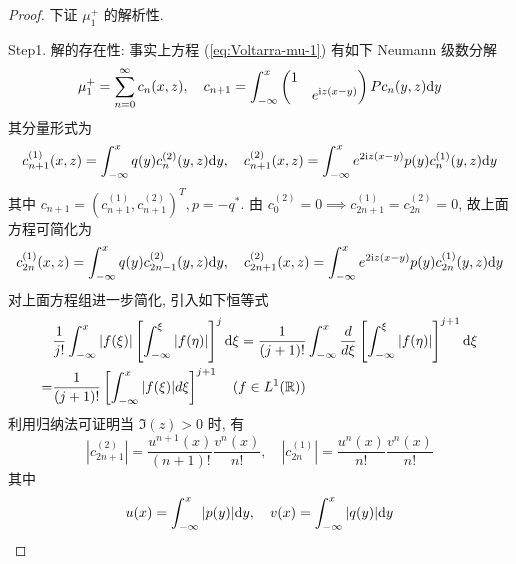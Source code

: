 \begin{proof}
  下证 $ \mu_{1}^{+} $ 的解析性. 

  Step1. 解的存在性: 事实上方程 (\ref{eq:Voltarra-mu-1}) 有如下 Neumann 级数分解
  \begin{equation}
    \mu_{1}^{+} = \sum_{n=0}^{\infty} c_{n}(x,z), \quad c_{n+1} = \int_{-\infty}^{x} \begin{pmatrix} 1 &  \\  & e^{ \mathrm{i} z (x - y)} \end{pmatrix} P c_{n}(y,z) \mathrm{d} y \label{eq:Neumann-series-mu-1+}
  \end{equation}
  其分量形式为 
  \begin{equation}
    c_{n+1}^{(1)}(x,z) = \int_{-\infty}^{x} q(y) c_{n}^{(2)}(y,z) \mathrm{d} y, \quad c_{n+1}^{(2)}(x,z) = \int_{-\infty}^{x} e^{2 \mathrm{i} z(x-y)} p(y) c_{n}^{(1)}(y,z) \mathrm{d} y
  \end{equation}
  其中  $c_{n+1} = (c_{n+1}^{(1)}, c_{n+1}^{(2)})^T, p = -q^{*} $. 
  由 $ c_{0}^{(2)} = 0 \implies c_{2n+1}^{(1)} = c_{2n}^{(2)} = 0 $, 故上面方程可简化为
  \begin{equation}
    c_{2n}^{(1)}(x,z) = \int_{-\infty}^{x} q(y) c_{2n-1}^{(2)}(y,z) \mathrm{d} y, \quad c_{2n+1}^{(2)}(x,z) = \int_{-\infty}^{x} e^{2 \mathrm{i} z(x-y)} p(y) c_{2n}^{(1)}(y,z) \mathrm{d} y \label{eq:Neumann-series-coefficient}
  \end{equation}
  对上面方程组进一步简化, 引入如下恒等式
  \begin{equation}
    \begin{aligned}
    &\frac{1}{j!} \int_{-\infty}^{x} | f(\xi) | \left[\int_{-\infty}^{\xi} | f(\eta) | \right]^{j} \mathrm{d} \xi = \frac{1}{(j+1)!} \int_{-\infty}^{x} \frac{d}{d \xi} \left[\int_{-\infty}^{\xi} | f(\eta) | \right]^{j+1} \mathrm{d} \xi \\
    = &\frac{1}{(j+1)!} \left[\int_{-\infty}^{x} | f(\xi) | d \xi \right]^{j+1} \quad (f \in L^{1}(\mathbb{R}))
    \end{aligned} \label{eq:Neumann-series-coefficient-identity}
  \end{equation}
  利用归纳法可证明当 $ \Im(z) > 0 $ 时, 有
  \begin{equation}
      |c_{2n+1}^{(2)} | = \frac{u^{n+1}(x)}{(n+1)!} \frac{v^{n}(x)}{n!} , \quad |c_{2n}^{(1)} | = \frac{u^{n}(x)}{n!} \frac{v^{n}(x)}{n!} \label{eq:Recurrence-relation}
  \end{equation}
  其中 
  \begin{equation}
      u(x) = \int_{-\infty}^{x} |p(y)| \rmd y, \quad v(x) = \int_{-\infty}^{x} |q(y)| \rmd y

\end{equation}
\end{proof}
